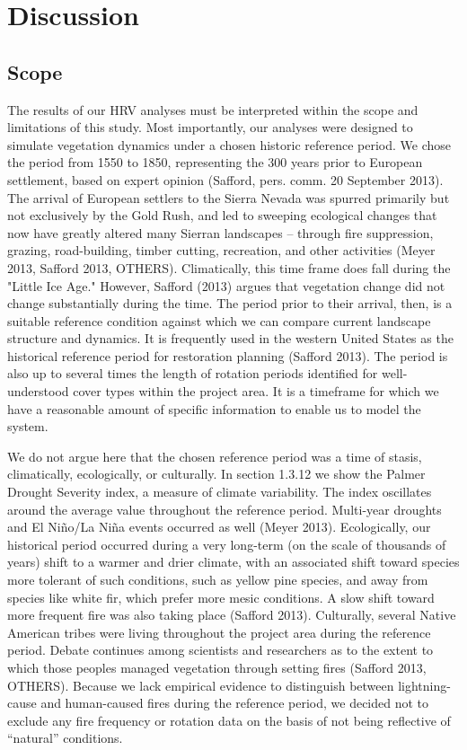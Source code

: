 \chapter{Discussion}
\section{Scope}
The results of our HRV analyses must be interpreted within the scope and limitations of this study. Most importantly, our analyses were designed to simulate vegetation dynamics under a chosen historic reference period. We chose the period from 1550 to 1850, representing the 300 years prior to European settlement, based on expert opinion (Safford, pers. comm. 20 September 2013). The arrival of European settlers to the Sierra Nevada was spurred primarily but not exclusively by the Gold Rush, and led to sweeping ecological changes that now have greatly altered many Sierran landscapes -- through fire suppression, grazing, road-building, timber cutting, recreation, and other activities (Meyer 2013, Safford 2013, OTHERS). Climatically, this time frame does fall during the "Little Ice Age." However, Safford (2013) argues that vegetation change did not change substantially during the time. The period prior to their arrival, then, is a suitable reference condition against which we can compare current landscape structure and dynamics. It is frequently used in the western United States as the historical reference period for restoration planning (Safford 2013). The period is also up to several times the length of rotation periods identified for well-understood cover types within the project area. It is a timeframe for which we have a reasonable amount of specific information to enable us to model the system.

We do not argue here that the chosen reference period was a time of stasis, climatically, ecologically, or culturally. In section 1.3.12 we show the Palmer Drought Severity index, a measure of climate variability. The index oscillates around the average value throughout the reference period. Multi-year droughts and El Niño/La Niña events occurred as well (Meyer 2013). Ecologically, our historical period occurred during a very long-term (on the scale of thousands of years) shift to a warmer and drier climate, with an associated shift toward species more tolerant of such conditions, such as yellow pine species, and away from species like white fir, which prefer more mesic conditions. A slow shift toward more frequent fire was also taking place (Safford 2013). Culturally, several Native American tribes were living throughout the project area during the reference period. Debate continues among scientists and researchers as to the extent to which those peoples managed vegetation through setting fires (Safford 2013, OTHERS). Because we lack empirical evidence to distinguish between lightning-cause and human-caused fires during the reference period, we decided not to exclude any fire frequency or rotation data on the basis of not being reflective of ``natural'' conditions.

